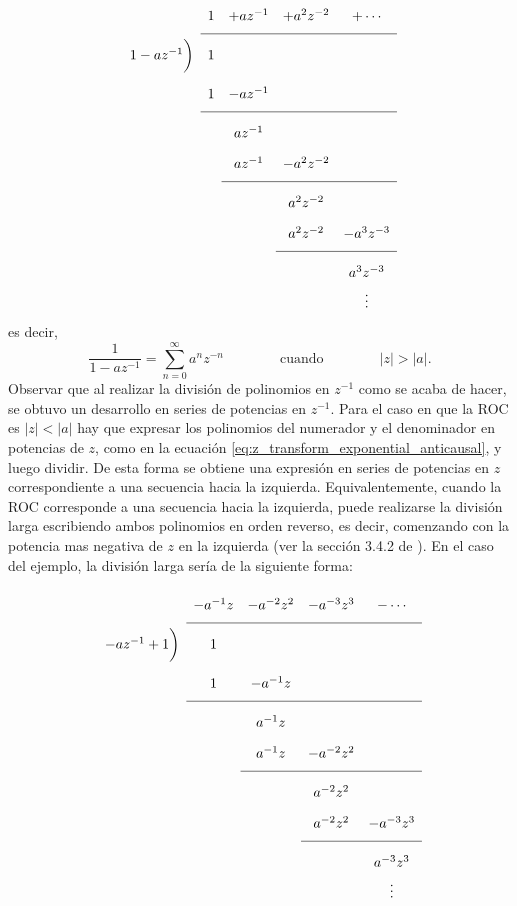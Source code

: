 \documentclass[a4paper]{report}
\begin{document}
\[
\setlength\extrarowheight{10pt}
\begin{array}[t]{ccccc}
                       & 1 & +az^{-1} & +a^2z^{-2} & +\cdots\\[\medskipamount]
\cline{2-5}
1-az^{-1} 
                \bigg) & 1  &   &  &\\
                       & 1  & -az^{-1} &  & \\[\medskipamount]
\cline{2-5}
                       &    & az^{-1} &   & \\
                       &    & az^{-1} &  -a^2z^{-2} & \\[\medskipamount]
\cline{3-5}
                       &    &         &  a^2z^{-2} & \\
                       &    &         &  a^2z^{-2} & -a^3z^{-3} \\[\medskipamount]
\cline{4-5}
                       &    &                  &   & a^3z^{-3}\\
                       &    &                  &   & \vdots\\
\end{array}
\] 
es decir,
\[
 \frac{1}{1-az^{-1}}=\sum_{n=0}^\infty a^nz^{-n}
 \qquad\qquad\textrm{cuando}\qquad\qquad
 |z|>|a|.
\]
Observar que al realizar la división de polinomios en \(z^{-1}\) como se acaba de hacer, se obtuvo un desarrollo en series de potencias en \(z^{-1}\). Para el caso en que la ROC es \(|z|<|a|\) hay que expresar los polinomios del numerador y el denominador en potencias de \(z\), como en la ecuación \ref{eq:z_transform_exponential_anticausal}, y luego dividir. De esta forma se obtiene una expresión en series de potencias en \(z\) correspondiente a una secuencia hacia la izquierda. Equivalentemente, cuando la ROC corresponde a una secuencia hacia la izquierda, puede realizarse la división larga escribiendo ambos polinomios en orden reverso, es decir, comenzando con la potencia mas negativa de \(z\) en la izquierda (ver la sección 3.4.2 de \cite{proakis06digital}). En el caso del ejemplo, la división larga sería de la siguiente forma:
\[
\setlength\extrarowheight{10pt}
\begin{array}[t]{ccccc}
                       & -a^{-1}z & -a^{-2}z^2 & -a^{-3}z^{3} & -\cdots\\[\medskipamount]
\cline{2-5}
-az^{-1}+1 
                \bigg) & 1  &   &  &\\
                       & 1  & -a^{-1}z &  & \\[\medskipamount]
\cline{2-5}
                       &    & a^{-1}z &   & \\
                       &    & a^{-1}z &  -a^{-2}z^2 & \\[\medskipamount]
\cline{3-5}
                       &    &         &  a^{-2}z^2 & \\
                       &    &         &  a^{-2}z^2 & -a^{-3}z^3 \\[\medskipamount]
\cline{4-5}
                       &    &                  &   & a^{-3}z^3\\
                       &    &                  &   & \vdots\\
\end{array}
\]
\end{document}
